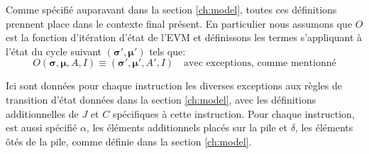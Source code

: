 \documentclass[9pt,oneside]{amsart}
\begin{document}
Comme spécifié auparavant dans la section \ref{ch:model}, toutes ces définitions prennent place dans le contexte final présent. En particulier nous assumons que $O$ est la fonction d'itération d'état de l'EVM et définissons les termes s'appliquant à l'état du cycle suivant $(\boldsymbol{\sigma}', \boldsymbol{\mu}')$ tels que:
\begin{equation}
O(\boldsymbol{\sigma}, \boldsymbol{\mu}, A, I) \equiv (\boldsymbol{\sigma}', \boldsymbol{\mu}', A', I) \quad \text{avec exceptions, comme mentionné}
\end{equation}

Ici sont données pour chaque instruction les diverses exceptions aux règles de transition d'état données dans la section \ref{ch:model}, avec les définitions additionnelles de $J$ et $C$ spécifiques à cette instruction. Pour chaque instruction, est aussi spécifié $\alpha$, les éléments additionnels placés sur la pile et $\delta$, les éléments ôtés de la pile, comme définie dans la section \ref{ch:model}.
\end{document}
